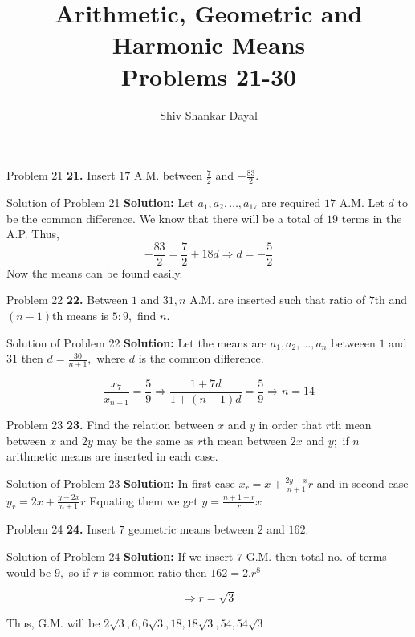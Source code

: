 \documentclass[aspectratio=1610,8pt]{beamer}
\title{Arithmetic, Geometric and Harmonic Means\\Problems 21-30}
\author[Shiv Shankar Dayal]{Shiv Shankar Dayal}
\begin{document}
\begin{frame}
  \titlepage
\end{frame}
\begin{frame}{Problem 21}
  \textbf{21.} Insert $17$ A.M. between $\frac{7}{2}$ and $-\frac{83}{2}.$
\end{frame}
\begin{frame}{Solution of Problem 21}
  \textbf{Solution:} Let $a_1, a_2, \ldots, a_{17}$ are required $17$ A.M. Let
  $d$ to be the common difference. We know that there will be a total of $19$
  terms in the A.P. Thus,
  $$-\frac{83}{2} = \frac{7}{2} + 18d \Rightarrow d = - \frac{5}{2}$$
  Now the means can be found easily.
\end{frame}
\begin{frame}{Problem 22}
  \textbf{22.} Between $1$ and $31, n$ A.M. are inserted such that ratio of
  $7$th and $(n - 1)$th means is $5:9,$ find $n.$
\end{frame}
\begin{frame}{Solution of Problem 22}
  \textbf{Solution:} Let the means are $a_1, a_2, \ldots, a_n$ betweeen $1$ and
  $31$ then $d = \frac{30}{n + 1},$ where $d$ is the common difference.

  $$\frac{x_7}{x_{n - 1}} = \frac{5}{9}\Rightarrow \frac{1 + 7d}{1 + (n - 1)d}
  = \frac{5}{9} \Rightarrow n = 14$$
\end{frame}
\begin{frame}{Problem 23}
  \textbf{23.} Find the relation between $x$ and $y$ in order that $r$th mean
  between $x$ and $2y$ may be the same as $r$th mean between $2x$ and $y;$ if
  $n$ arithmetic means are inserted in each case.
\end{frame}
\begin{frame}{Solution of Problem 23}
  \textbf{Solution:} In first case $x_r = x + \frac{2y - x}{n + 1}r$ and in
  second case $y_r = 2x + \frac{y - 2x}{n + 1}r$
  \linebreak
  \linebreak
  Equating them we get $y = \frac{n + 1 - r}{r}x$
\end{frame}
\begin{frame}{Problem 24}
  \textbf{24.} Insert $7$ geometric means between $2$ and $162.$
\end{frame}
\begin{frame}{Solution of Problem 24}
  \textbf{Solution:} If we insert $7$ G.M. then total no. of terms would be
  $9,$ so if $r$ is common ratio then $162 = 2.r^8$

  $$\Rightarrow r = \sqrt{3}$$

  Thus, G.M. will be $2\sqrt{3}, 6, 6\sqrt{3}, 18, 18\sqrt{3}, 54, 54\sqrt{3}$
\end{frame}
\end{document}
